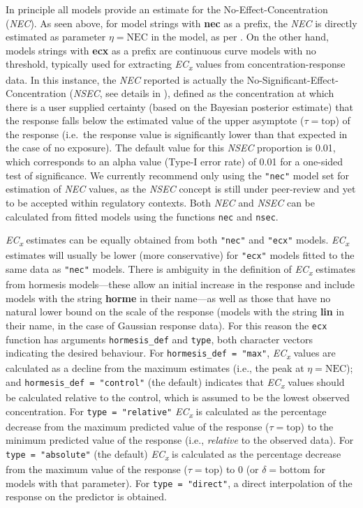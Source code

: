 \documentclass[
  shortnames]{jss}
\begin{document}
In principle all models provide an estimate for the No-Effect-Concentration (\emph{NEC}). As seen above, for model strings with \textbf{nec} as a prefix, the \emph{NEC} is directly estimated as parameter \(\eta = \text{NEC}\) in the model, as per \citep{Fox2010}. On the other hand, models strings with \textbf{ecx} as a prefix are continuous curve models with no threshold, typically used for extracting \emph{EC\textsubscript{x}} values from concentration-response data. In this instance, the \emph{NEC} reported is actually the No-Significant-Effect-Concentration (\emph{NSEC}, see details in \citet{Fisher2022}), defined as the concentration at which there is a user supplied certainty (based on the Bayesian posterior estimate) that the response falls below the estimated value of the upper asymptote (\(\tau = \text{top}\)) of the response (i.e.~the response value is significantly lower than that expected in the case of no exposure). The default value for this \emph{NSEC} proportion is 0.01, which corresponds to an alpha value (Type-I error rate) of 0.01 for a one-sided test of significance. We currently recommend only using the \texttt{"nec"} model set for estimation of \emph{NEC} values, as the \emph{NSEC} concept is still under peer-review and yet to be accepted within regulatory contexts. Both \emph{NEC} and \emph{NSEC} can be calculated from fitted models using the functions \texttt{nec} and \texttt{nsec}.

\emph{EC\textsubscript{x}} estimates can be equally obtained from both \texttt{"nec"} and \texttt{"ecx"} models. \emph{EC\textsubscript{x}} estimates will usually be lower (more conservative) for \texttt{"ecx"} models fitted to the same data as \texttt{"nec"} models. There is ambiguity in the definition of \emph{EC\textsubscript{x}} estimates from hormesis models---these allow an initial increase in the response \citep[see][]{Mattson2008} and include models with the string \textbf{horme} in their name---as well as those that have no natural lower bound on the scale of the response (models with the string \textbf{lin} in their name, in the case of Gaussian response data). For this reason the \texttt{ecx} function has arguments \texttt{hormesis\_def} and \texttt{type}, both character vectors indicating the desired behaviour. For \texttt{hormesis\_def\ =\ "max"}, \emph{EC\textsubscript{x}} values are calculated as a decline from the maximum estimates (i.e., the peak at \(\eta = \text{NEC}\)); and \texttt{hormesis\_def\ =\ "control"} (the default) indicates that \emph{EC\textsubscript{x}} values should be calculated relative to the control, which is assumed to be the lowest observed concentration. For \texttt{type\ =\ "relative"} \emph{EC\textsubscript{x}} is calculated as the percentage decrease from the maximum predicted value of the response (\(\tau = \text{top}\)) to the minimum predicted value of the response (i.e., \emph{relative} to the observed data). For \texttt{type\ =\ "absolute"} (the default) \emph{EC\textsubscript{x}} is calculated as the percentage decrease from the maximum value of the response (\(\tau = \text{top}\)) to 0 (or \(\delta = \text{bottom}\) for models with that parameter). For \texttt{type\ =\ "direct"}, a direct interpolation of the response on the predictor is obtained.
\end{document}
